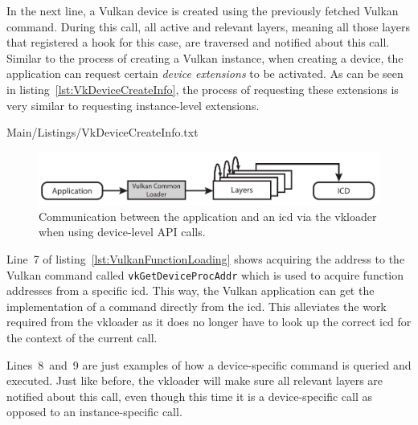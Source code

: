       In the next line, a Vulkan device is created using the previously fetched Vulkan command.
      During this call, all active and relevant layers, meaning all those layers that registered a hook for this case, are traversed and notified about this call.
      Similar to the process of creating a Vulkan instance, when creating a device, the application can request certain \textit{device extensions} to be activated.
      As can be seen in listing~\ref{lst:VkDeviceCreateInfo}, the process of requesting these extensions is very similar to requesting instance-level extensions.

      
      {Main/Listings/VkDeviceCreateInfo.txt}

      \begin{figure}
        \includegraphics[width=1.0\textwidth]{Main/Images/VulkanLoaderDeviceLayers}
        \centering
        \caption{Communication between the application and an \acrfull{icd} via the \gls{vkloader} when using device-level API calls.}
        \label{fig:VulkanLoaderWithDeviceLayers}
      \end{figure}

      Line~7 of listing~\ref{lst:VulkanFunctionLoading} shows acquiring the address to the Vulkan command called \lstinline{vkGetDeviceProcAddr} which is used to acquire function addresses from a specific \gls{icd}.
      This way, the Vulkan application can get the implementation of a command directly from the \gls{icd}.
      This alleviates the work required from the \gls{vkloader} as it does no longer have to look up the correct \gls{icd} for the context of the current call.

      Lines~8~and~9 are just examples of how a device-specific command is queried and executed.
      Just like before, the \gls{vkloader} will make sure all relevant layers are notified about this call, even though this time it is a device-specific call as opposed to an instance-specific call.

